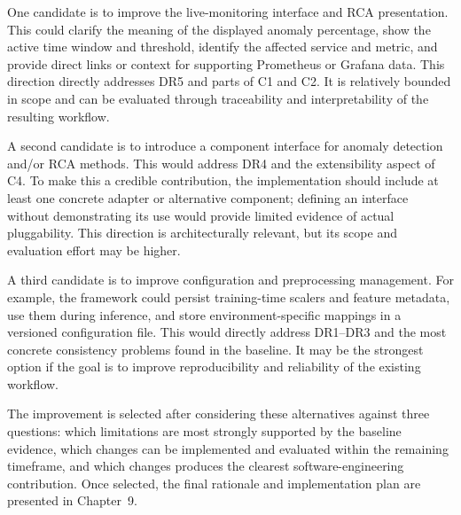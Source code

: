 One candidate is to improve the live-monitoring interface and RCA presentation. This could clarify the meaning of the displayed anomaly percentage, show the active time window and threshold, identify the affected service and metric, and provide direct links or context for supporting Prometheus or Grafana data. This direction directly addresses DR5 and parts of C1 and C2. It is relatively bounded in scope and can be evaluated through traceability and interpretability of the resulting workflow.

A second candidate is to introduce a component interface for anomaly detection and/or RCA methods. This would address DR4 and the extensibility aspect of C4. To make this a credible contribution, the implementation should include at least one concrete adapter or alternative component; defining an interface without demonstrating its use would provide limited evidence of actual pluggability. This direction is architecturally relevant, but its scope and evaluation effort may be higher.

A third candidate is to improve configuration and preprocessing management. For example, the framework could persist training-time scalers and feature metadata, use them during inference, and store environment-specific mappings in a versioned configuration file. This would directly address DR1--DR3 and the most concrete consistency problems found in the baseline. It may be the strongest option if the goal is to improve reproducibility and reliability of the existing workflow.

The improvement is selected after considering these alternatives against three questions: which limitations are most strongly supported by the baseline evidence, which changes can be implemented and evaluated within the remaining timeframe, and which changes produces the clearest software-engineering contribution. Once selected, the final rationale and implementation plan are presented in Chapter~9.


